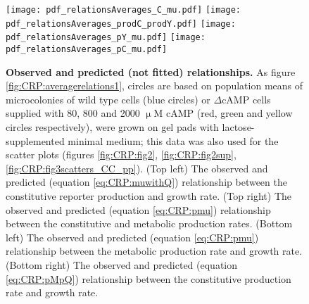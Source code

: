 \begin{figure}%
	\centering
	\texttt{[image: pdf\_relationsAverages\_C\_mu.pdf]}
	\texttt{[image: pdf\_relationsAverages\_prodC\_prodY.pdf]}	
	\texttt{[image: pdf\_relationsAverages\_pY\_mu.pdf]}
	\texttt{[image: pdf\_relationsAverages\_pC\_mu.pdf]}	
	\caption{ 
		\textbf{Observed and predicted (not fitted) relationships.}
        As figure \ref{fig:CRP:averagerelations1}, circles 
        are based on population means of microcolonies of 
        wild type cells (blue circles) or $\Delta$cAMP cells supplied with 80, 800 and 2000 $\upmu$M cAMP (red, green and yellow circles respectively),
        were grown on gel pads with lactose-supplemented minimal medium; 
        this data was also used for the scatter plots (figures \ref{fig:CRP:fig2}, \ref{fig:CRP:fig2sup}, \ref{fig:CRP:fig3scatters_CC_pp}).
		(Top left) The observed and predicted (equation \ref{eq:CRP:muwithQ}) relationship between the constitutive reporter production and growth rate.
		(Top right) The observed and predicted (equation \ref{eq:CRP:pmu}) relationship between the constitutive and metabolic production rates.
		(Bottom left) The observed and predicted (equation \ref{eq:CRP:pmu}) relationship between the metabolic production rate and growth rate.
		(Bottom right) The observed and predicted (equation \ref{eq:CRP:pMpQ}) relationship between the constitutive production rate and growth rate.
	}
	\label{fig:CRP:averagerelations2}
\end{figure}%



